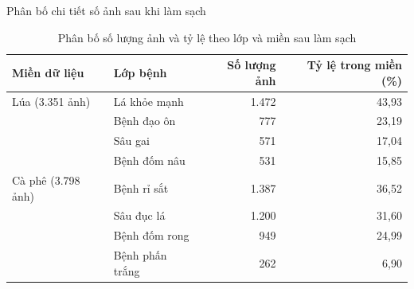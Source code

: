 \begin{frame}
    Phân bố chi tiết số ảnh sau khi làm sạch
    \vspace{0.1cm}
    \begin{table}[h]
        \centering
        \caption{Phân bố số lượng ảnh và tỷ lệ theo lớp và miền sau làm sạch}
        \label{tab:slide_class_dist_clean}
        \footnotesize
        \setlength{\tabcolsep}{12pt}
        \begin{tabular}{llrr}
            \toprule
            Miền dữ liệu       & Lớp bệnh        & Số lượng ảnh & Tỷ lệ trong miền (\%) \\
            \midrule
            Lúa (3.351 ảnh)    & Lá khỏe mạnh    & 1.472        & 43,93                 \\
                               & Bệnh đạo ôn     & 777          & 23,19                 \\
                               & Sâu gai         & 571          & 17,04                 \\
                               & Bệnh đốm nâu    & 531          & 15,85                 \\
            \midrule
            Cà phê (3.798 ảnh) & Bệnh rỉ sắt     & 1.387        & 36,52                 \\
                               & Sâu đục lá      & 1.200        & 31,60                 \\
                               & Bệnh đốm rong   & 949          & 24,99                 \\
                               & Bệnh phấn trắng & 262          & 6,90                  \\
            \bottomrule
        \end{tabular}
    \end{table}
\end{frame}

